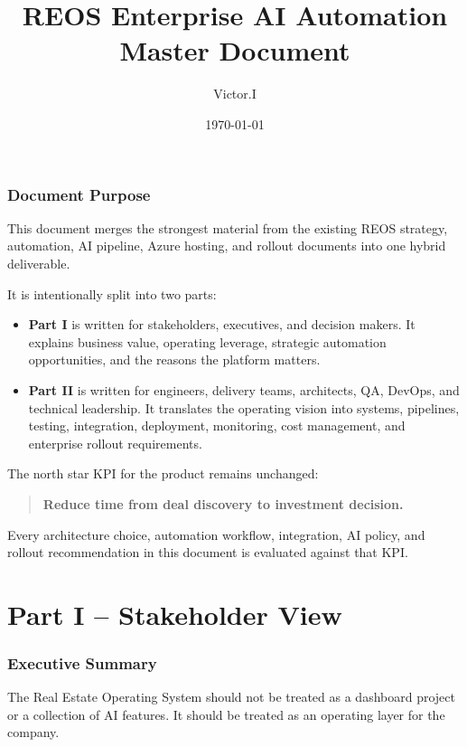 \documentclass[11pt]{article}
\title{REOS Enterprise AI Automation Master Document}
\author{Victor.I}
\date{\today}
\begin{document}
\maketitle
\tableofcontents
\newpage

\section{Document Purpose}

This document merges the strongest material from the existing REOS strategy, automation, AI pipeline, Azure hosting, and rollout documents into one hybrid deliverable.

It is intentionally split into two parts:

\begin{itemize}
\item \textbf{Part I} is written for stakeholders, executives, and decision makers. It explains business value, operating leverage, strategic automation opportunities, and the reasons the platform matters.
\item \textbf{Part II} is written for engineers, delivery teams, architects, QA, DevOps, and technical leadership. It translates the operating vision into systems, pipelines, testing, integration, deployment, monitoring, cost management, and enterprise rollout requirements.
\end{itemize}

The north star KPI for the product remains unchanged:

\begin{quote}
\textbf{Reduce time from deal discovery to investment decision.}
\end{quote}

Every architecture choice, automation workflow, integration, AI policy, and rollout recommendation in this document is evaluated against that KPI.

\newpage
\part*{Part I -- Stakeholder View}

\section{Executive Summary}

The Real Estate Operating System should not be treated as a dashboard project or a collection of AI features. It should be treated as an operating layer for the company.
\end{document}
